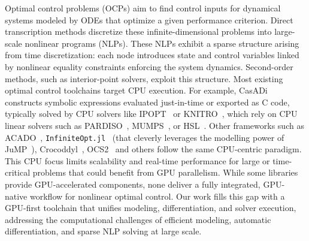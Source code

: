 Optimal control problems (OCPs) aim to find control inputs for dynamical systems modeled by ODEs that optimize a given performance criterion.
Direct transcription methods discretize these infinite-dimensional problems into large-scale nonlinear programs (NLPs).
These NLPs exhibit a sparse structure arising from time discretization: each node introduces state and control variables linked by nonlinear equality constraints enforcing the system dynamics.
Second-order methods, such as interior-point solvers, exploit this structure. %
%
Most existing optimal control toolchains target CPU execution.
For example, CasADi~\cite{Andersson2019} constructs symbolic expressions evaluated just-in-time or exported as C code, typically solved by CPU solvers like IPOPT~\cite{wachter2006implementation} or KNITRO~\cite{byrd2006k}, which rely on CPU linear solvers such as PARDISO~\cite{schenk2004solving}, MUMPS~\cite{amestoy2000mumps}, or HSL~\cite{fowkes2024libhsl}.
%
Other frameworks such as ACADO~\cite{houska2011acado}, 
\texttt{InfiniteOpt.jl}~\cite{pulsipher2022unifying} (that cleverly leverages 
the modelling power of JuMP~\cite{dunning2017jump}),
Crocoddyl~\cite{mastalli2020crocoddyl}, OCS2~\cite{OCS2} and others
follow the same CPU-centric paradigm.
%
This CPU focus limits scalability and real-time performance for large or time-critical problems that could benefit from GPU parallelism.
While some libraries provide GPU-accelerated components, none deliver a fully integrated, GPU-native workflow for nonlinear optimal control.
%
Our work fills this gap with a GPU-first toolchain that unifies modeling, differentiation, and solver execution, addressing the computational challenges of efficient modeling, automatic differentiation, and sparse NLP solving at large scale.

